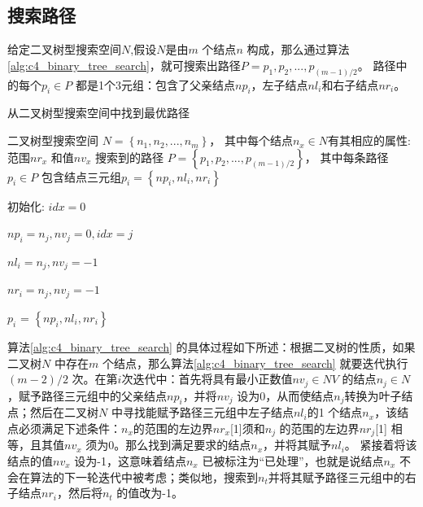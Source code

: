         \subsection{搜索路径}

        给定二叉树型搜索空间$N$,假设$N$是由$m$ 个结点$n$ 构成，那么通过算法\ref{alg:c4_binary_tree_search}，就可搜索出路径$P={p_1,p_2,...,p_{(m-1)/2}}$。 路径中的每个$p_i \in P$ 都是1个3元组：包含了父亲结点$np_i$，左子结点$nl_i$和右子结点$nr_i$。

        \begin{algorithm}[!h]
    	\renewcommand{\algorithmicrequire}{\textbf{输入:}}	
        \renewcommand{\algorithmicensure}{\textbf{输出:}}
    	\caption{从二叉树型搜索空间中找到最优路径}
    	\label{alg:c4_binary_tree_search}
    	\begin{algorithmic}[1]
    		\REQUIRE 二叉树型搜索空间 $N=\left\{n_1,n_2,...,n_m\right\}$， 其中每个结点$n_x \in N$有其相应的属性: 范围$nr_x$ 和值$nv_x$
    		\ENSURE 搜索到的路径 $P=\left\{p_1,p_2,...,p_{(m-1)/2}\right\}$， 其中每条路径$p_{i} \in P$ 包含结点三元组$p_{i}=\left\{np_{i},nl_{i},nr_{i}\right\}$

          \STATE 初始化: $idx=0$

          \STATE $np_i = n_j, nv_j = 0, idx = j$
          \ENDIF

          \STATE $nl_i = n_j, nv_j = -1$
          \ENDIF

          \STATE $nr_i = n_j, nv_j = -1$
          \ENDIF

          \ENDFOR

          \STATE $p_{i}$ = $\left\{ np_{i},nl_{i},nr_{i} \right\}$

          \ENDFOR
    	  \end{algorithmic}
        \end{algorithm}

        算法\ref{alg:c4_binary_tree_search} 的具体过程如下所述：根据二叉树的性质，如果二叉树$N$ 中存在$m$ 个结点，那么算法\ref{alg:c4_binary_tree_search} 就要迭代执行$(m-2)/2$ 次。在第$i$次迭代中：首先将具有最小正数值$nv_j \in NV$ 的结点$n_j \in N$，赋予路径三元组中的父亲结点$np_i$，并将$nv_j$ 设为0，从而使结点$n_j$转换为叶子结点；然后在二叉树$N$ 中寻找能赋予路径三元组中左子结点$nl_i$的1 个结点$n_x$，该结点必须满足下述条件：$n_x$的范围的左边界$nr_x$[1]须和$n_j$ 的范围的左边界$nr_j$[1] 相等，且其值$nv_x$ 须为0。那么找到满足要求的结点$n_x$，并将其赋予$nl_i$。 紧接着将该结点的值$nv_x$ 设为-1，这意味着结点$n_x$ 已被标注为``已处理''，也就是说结点$n_x$ 不会在算法的下一轮迭代中被考虑；类似地，搜索到$n_t$并将其赋予路径三元组中的右子结点$nr_i$，然后将$n_t$ 的值改为-1。

